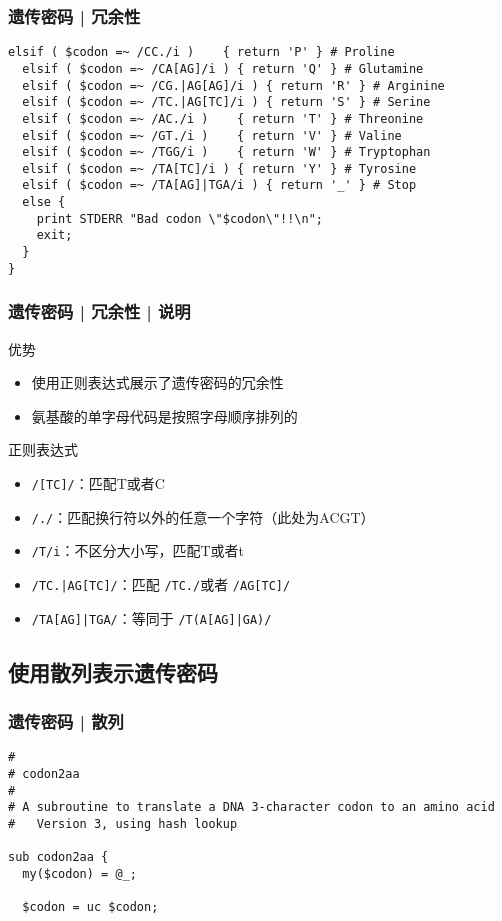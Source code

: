 \begin{frame}[fragile]
  \frametitle{遗传密码 | 冗余性}
\begin{lstlisting}[firstnumber=21,basicstyle=\scriptsize\tt,numberstyle=\tiny]
  elsif ( $codon =~ /CC./i )    { return 'P' } # Proline
  elsif ( $codon =~ /CA[AG]/i ) { return 'Q' } # Glutamine
  elsif ( $codon =~ /CG.|AG[AG]/i ) { return 'R' } # Arginine
  elsif ( $codon =~ /TC.|AG[TC]/i ) { return 'S' } # Serine
  elsif ( $codon =~ /AC./i )    { return 'T' } # Threonine
  elsif ( $codon =~ /GT./i )    { return 'V' } # Valine
  elsif ( $codon =~ /TGG/i )    { return 'W' } # Tryptophan
  elsif ( $codon =~ /TA[TC]/i ) { return 'Y' } # Tyrosine
  elsif ( $codon =~ /TA[AG]|TGA/i ) { return '_' } # Stop
  else {
    print STDERR "Bad codon \"$codon\"!!\n";
    exit;
  }
}
\end{lstlisting}
\end{frame}

\begin{frame}[fragile]
  \frametitle{遗传密码 | 冗余性 | 说明}
  \begin{block}{优势}
    \begin{itemize}
      \item 使用正则表达式展示了遗传密码的冗余性
      \item 氨基酸的单字母代码是按照字母顺序排列的
    \end{itemize}
  \end{block}
  \pause
  \begin{block}{\alert{正则表达式}}
    \begin{itemize}
      \item \verb|/[TC]/|：匹配T或者C
      \item \verb|/./|：匹配换行符以外的任意一个字符（此处为ACGT）
      \item \verb|/T/i|：不区分大小写，匹配T或者t
      \item \verb=/TC.|AG[TC]/=：匹配 \verb|/TC./|或者 \verb|/AG[TC]/|
      \item \verb=/TA[AG]|TGA/=：等同于 \verb=/T(A[AG]|GA)/=
    \end{itemize}
  \end{block}
\end{frame}

\subsection{使用散列表示遗传密码}
\begin{frame}[fragile]
  \frametitle{遗传密码 | 散列}
\begin{lstlisting}[firstnumber=1]
#
# codon2aa
#
# A subroutine to translate a DNA 3-character codon to an amino acid
#   Version 3, using hash lookup

sub codon2aa {
  my($codon) = @_;

  $codon = uc $codon;
\end{lstlisting}
\end{frame}

